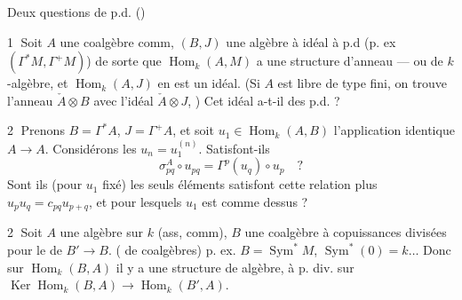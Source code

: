 
Deux questions de p.d. ()

\textcircled{1} Soit $A$ une coalgèbre  comm,
$(B,J)$ une algèbre à idéal à p.d
(p. ex $(\Gamma^{\ast}M,\Gamma^{+}M)$)
de sorte que $\operatorname{Hom}_k(A,M)$ a une structure
d'anneau --- ou de $k$-algèbre, et
$\operatorname{Hom}_k(A,J)$ en est un idéal. (Si
$A$ est libre de type fini, on trouve
l'anneau $\check A\otimes B$ avec l'idéal $\check A\otimes J$,
) Cet idéal a-t-il
des p.d. ?

\textcircled{2} Prenons $B=\Gamma^{\ast}A$, $J=\Gamma^{+}A$, et
soit $u_1\in\operatorname{Hom}_k(A,B)$ l'application
identique $A\longrightarrow A$. Considérons les
$u_n=u_1^{(n)}$. Satisfont-ils
\[
\sigma^{A}_{pq}\circ u_{pq}=\Gamma^p(u_q)\circ u_p\quad ?
\]
Sont ils (pour $u_1$ fixé) les seuls
éléments  satisfont cette relation
plus $u_pu_q=c_{pq}u_{p+q}$, et pour
lesquels $u_1$ est comme dessus ?

\textcircled{2} Soit $A$ une algèbre sur $k$ (ass, comm),
$B$ une coalgèbre à copuissances divisées
pour le  de $B'\longrightarrow B$. ( de
coalgèbres) p. ex. $B=\operatorname{Sym}^{\ast}M$,
 $\operatorname{Sym}^{\ast}(0)=k\ldots$ Donc sur
$\operatorname{Hom}_k(B,A)$ il y a une structure de
 algèbre, à p. div. sur
$\operatorname{Ker}\operatorname{Hom}_k(B,A)\longrightarrow\operatorname{Hom}_k(B',A)$.
